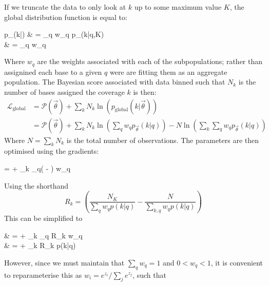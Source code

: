 \documentclass[fleqn,usenatbib]{mnras}
\begin{document}
			If we truncate the data to only look at $k$ up to some maximum value $K$, the global distribution function is equal to:
			\begin{spalign}
				p_(k|\vec{\theta}) & = \sum_q w_q p_{\vec{\theta}}(k|q,K)
				\\
				& =  \sum_q w_q 
			\end{spalign}
			Where $w_q$ are the weights associated with each of the subpopulations; rather than assignined each base to a given $q$ were are fitting them as an aggregate population.	The Bayesian score associated with data binned such that $N_k$ is the number of bases assigned the coverage $k$ is then:
			\begin{align}
				\mathcal{L}_\text{global} & = \mathcal{P}(\vec{\theta}) + \sum_k N_k \ln\left(p_\text{global}(k|\vec{\theta})\right)
				\\
				& =\mathcal{P}(\vec{\theta}) + \sum_k N_k \ln\left(\sum_q w_q p_{\vec{\theta}}(k|q)\right) - N \ln\left(\sum_k \sum_q w_q p_{\vec{\theta}}(k|q)\right) 
			\end{align}
			Where $N = \sum_k N_k$ is the total number of observations. The parameters are then optimised using the gradients:
			\begin{spalign}
				 =  + \sum_k \sum_q\left( - \right) w_q\pdiv{p(k|q)}{\theta_i}
			\end{spalign}
			Using the shorthand
			\begin{equation}
				R_k = \left(\frac{N_K}{\sum_q w_q p(k|q)} - \frac{N}{\sum_{k,q} w_q p(k|q)}\right)
			\end{equation}
			This can be simplified to
			\begin{spalign}
				 & =  + \sum_k \sum_q R_k  w_q
				\\
				 & =  + \sum_k R_k  p(k|q)
			\end{spalign}
			However, since we must maintain that $\sum_q w_q = 1$ and $0 < w_q < 1$, it is convenient to reparameterise this as $w_i = e^{z_i}/\sum_j e^{z_j}$, such that
\end{document}
